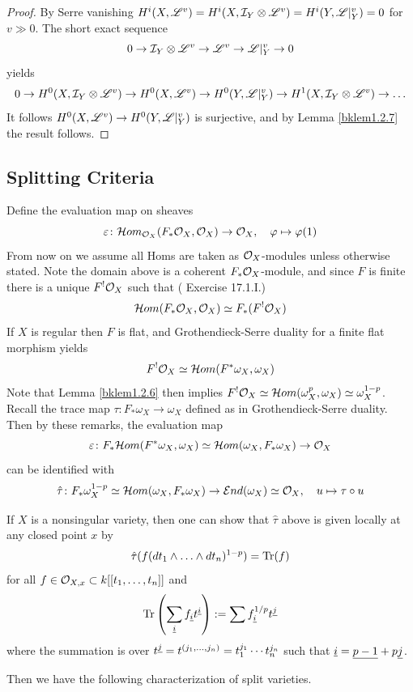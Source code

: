\documentclass[12pt]{article}
\begin{document}
\begin{proof}
    By Serre vanishing $H^i(X, \mathscr{L}^v) = H^i(X, \mathcal{I}_Y \otimes \mathscr{L}^v) = H^i(Y, \mathscr{L}\vert_Y^v) = 0$ for $v \gg 0$. The short exact sequence
    \[0 \rightarrow \mathcal{I}_Y \otimes \mathscr{L}^v \rightarrow \mathscr{L}^v \rightarrow \mathscr{L}\vert_Y^v \rightarrow 0 \]
    yields
    \[0 \rightarrow H^0(X, \mathcal{I}_Y \otimes \mathscr{L}^v) \rightarrow H^0(X, \mathscr{L}^v) \rightarrow H^0(Y, \mathscr{L}\vert_Y^v) \rightarrow H^1(X, \mathcal{I}_Y \otimes \mathscr{L}^v) \rightarrow \ldots\]
    It follows $H^0(X, \mathscr{L}^v) \rightarrow H^0(Y, \mathscr{L}\vert_Y^v)$ is surjective, and by Lemma \ref{bklem1.2.7} the result follows.
\end{proof}
\subsection{Splitting Criteria}
Define the evaluation map on sheaves
\[\varepsilon \colon \mathcal{H} om_{\mathcal{O}_X}(F_* \mathcal{O}_X, \mathcal{O}_X) \rightarrow \mathcal{O}_X, \quad \varphi \mapsto \varphi(1)\]
From now on we assume all Homs are taken as $\mathcal{O}_X$-modules unless otherwise stated. Note the domain above is a coherent $F_* \mathcal{O}_X$-module, and since $F$ is finite there is a unique $F^! \mathcal{O}_X$ such that (\cite{Vakil2025} Exercise 17.1.I.)
\[\mathcal{H} om(F_* \mathcal{O}_X, \mathcal{O}_X) \simeq F_*(F^! \mathcal{O}_X)\]
If $X$ is regular then $F$ is flat, and Grothendieck-Serre duality for a finite flat morphism yields
\[F^! \mathcal{O}_X \simeq \mathcal{H} om(F^* \omega_X, \omega_X)\]
Note that Lemma \ref{bklem1.2.6} then implies $F^! \mathcal{O}_X \simeq \mathcal{H} om(\omega_X^p, \omega_X) \simeq \omega_X^{1-p}$. Recall the trace map $\tau \colon F_* \omega_X \to \omega_X$ defined as in Grothendieck-Serre duality. Then by these remarks, the evaluation map
\[\varepsilon \colon F_* \mathcal{H} om(F^* \omega_X, \omega_X) \simeq \mathcal{H} om(\omega_X, F_* \omega_X) \rightarrow \mathcal{O}_X\]
can be identified with
\[\hat{\tau} \colon F_* \omega_X^{1-p} \simeq \mathcal{H} om(\omega_X, F_* \omega_X) \rightarrow \mathcal{E} nd(\omega_X) \simeq \mathcal{O}_X, \quad u \mapsto \tau \circ u\]
\begin{rem}If $X$ is a nonsingular variety, then one can show that $\hat{\tau}$ above is given locally at any closed point $x$ by
\[\hat{\tau}(f(dt_1 \wedge \ldots \wedge dt_n)^{1-p}) = \operatorname{Tr}(f)\]
for all $f \in \mathcal{O}_{X,x} \subset k[[t_1,\ldots,t_n]]$ and 
\[\operatorname{Tr}\left(\sum_{\underline{i}}f_{\underline{i}} t^{\underline i}\right) := \sum f_{\underline{i}}^{1/p} t^{\underline{j}}\] 
where the summation is over $t^{\underline j} = t^{(j_1,\ldots,j_n)} = t_1^{j_1} \cdots t_n^{j_n}$ such that $\underline i = \underline{p-1} + p \underline j$.
\end{rem}
Then we have the following characterization of split varieties.
\end{document}
